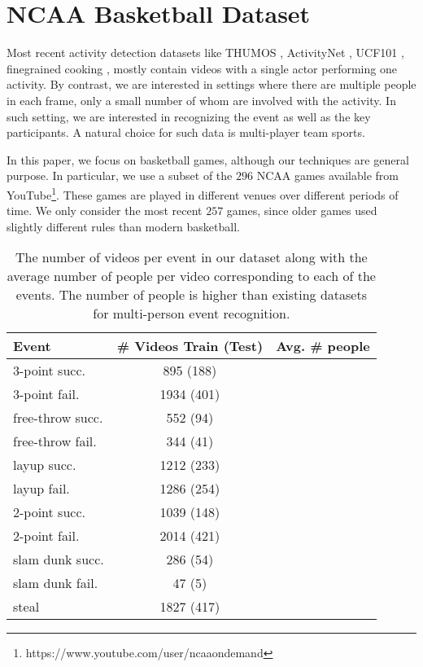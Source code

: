 
\section{NCAA Basketball Dataset}

Most recent activity detection datasets like THUMOS \cite{THUMOS},
ActivityNet \cite{ActivityNet}, UCF101 
\cite{UCF101}, finegrained cooking \cite{Finegrained_cooking},
mostly contain videos with a single actor performing one activity.
By contrast, we are interested in settings where there are multiple
people in each frame, only a small number of whom are involved with
the  activity. In such setting, we are interested in recognizing the event
as well as the key participants. A natural choice for such data is
multi-player team sports.

In this paper, we focus on basketball games, although our techniques
are general purpose.
In particular,  we use a subset of the $296$ NCAA games available from 
YouTube\footnote{https://www.youtube.com/user/ncaaondemand}.  These games are
played in different venues over different periods of time.
We only consider the most recent $257$ games, since older games used
slightly different rules than modern basketball.

\begin{table}[ht!]
\begin{center}
\small
 \begin{tabular}{|l|c|c|}
  \hline
  Event          & \# Videos Train (Test) & Avg. \# people \\ \hline \hline
  3-point succ.    & 895 (188) &  \\ 
  3-point fail.    & 1934 (401) &  \\ 
  free-throw succ. & 552 (94) &  \\ 
  free-throw fail. & 344 (41) &  \\  
  layup succ.      & 1212 (233) &  \\ 
  layup fail.      & 1286 (254) &  \\ 
  2-point succ.    & 1039 (148) &  \\ 
  2-point fail.    & 2014 (421) &  \\ 
  slam dunk succ.  & 286 (54) &  \\ 
  slam dunk fail.  & 47 (5) &  \\ 
  steal & 1827 (417) & \\ \hline  
  \end{tabular}
\end{center}
  \caption{The number of videos per event in our dataset along with
  the average number of people per video corresponding to each of the
events. The number of people is higher than existing datasets for
multi-person event recognition.}
  \label{tab:data_dist}
\end{table}


